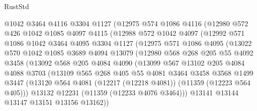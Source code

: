 \begin{lexlean}{RustStd}
\begin{coremodule}
{{{{{{{{{{{{{{{{{{{            @1042
            @3464
            @4116
            @3304
            @1127
            (@12975
              @574
              @1086
              @4116
              (@12980
                @572
                @426
                @1042
                @1085
                @4097
                @4115
                (@12988
                  @572
                  @1042
                  @4097
                  (@12992
                    @571
                    @1086
                    @1042
                    @3464
                    @4095
                    @3304
                    @1127
                    (@12975
                      @571
                      @1086
                      @4095
                      (@13022
                        @570
                        @1042
                        @1085
                        @3689
                        @4094
                        @13079
                        (@12980
                          @568
                          @268
                          @205
                          @55
                          @4092
                          @3458
                          (@13092
                            @568
                            @205
                            @4084
                            @4090
                            (@13099
                              @567
                              @13102
                              @205
                              @4084
                              @4088
                              @3703
                              (@13109
                                @565
                                @268
                                @405
                                @55
                                @4081
                                @3464
                                @3458
                                @3568
                                @1499
                                @3447
                                (@13120
                                  @564
                                  @4081
                                  (@12217 (@12218 @4081))
                                  (@11359 (@12223 @564 @405)))
                                @13132
                                @12231
                                (@11359 (@12233 @4076 @3464)))
                              @13141
                              @13144
                              @13147
                              @13151
                              @13156
                              @13162))
}}}}}}}}}}}}}}}}}}}
\end{coremodule}
\end{lexlean}
